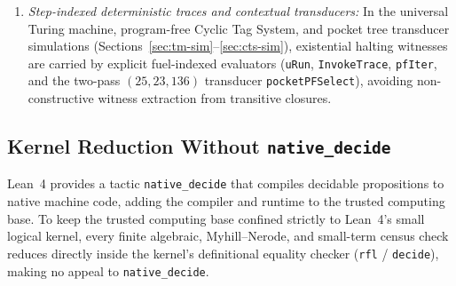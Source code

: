\documentclass[11pt,reqno]{amsart}
\numberwithin{equation}{section}
\theoremstyle{plain}
\theoremstyle{definition}
\theoremstyle{remark}
\begin{document}
\begin{enumerate}[label=(\arabic*),leftmargin=2.2em]
\item \emph{Step-indexed deterministic traces and contextual transducers:} In the universal Turing machine, program-free Cyclic Tag System, and pocket tree transducer simulations (Sections~\ref{sec:tm-sim}--\ref{sec:cts-sim}), existential halting witnesses are carried by explicit fuel-indexed evaluators (\texttt{uRun}, \texttt{InvokeTrace}, \texttt{pfIter}, and the two-pass $(25, 23, 136)$ transducer \texttt{pocketPFSelect}), avoiding non-constructive witness extraction from transitive closures.
\end{enumerate}

\subsection{Kernel Reduction Without \texorpdfstring{\texttt{native\_decide}}{native\_decide}}
\label{subsec:kernel-reduction}

Lean~4 provides a tactic \texttt{native\_decide} that compiles decidable propositions to native machine code, adding the compiler and runtime to the trusted computing base. To keep the trusted computing base confined strictly to Lean~4's small logical kernel, every finite algebraic, Myhill--Nerode, and small-term census check reduces directly inside the kernel's definitional equality checker (\texttt{rfl} / \texttt{decide}), making no appeal to \texttt{native\_decide}.
\end{document}
